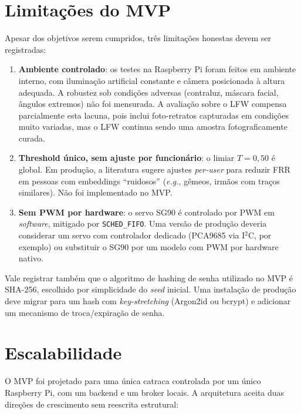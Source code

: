 \documentclass[12pt,a4paper]{report}
\begin{document}
\section{Limitações do MVP}

Apesar dos objetivos serem cumpridos, três limitações honestas devem
ser registradas:

\begin{enumerate}
    \item \textbf{Ambiente controlado}: os testes na Raspberry Pi
        foram feitos em ambiente interno, com iluminação artificial
        constante e câmera posicionada à altura adequada. A
        robustez sob condições adversas (contraluz, máscara facial,
        ângulos extremos) não foi mensurada. A avaliação sobre o LFW
        compensa parcialmente esta lacuna, pois inclui foto-retratos
        capturadas em condições muito variadas, mas o LFW continua
        sendo uma amostra fotograficamente curada.
    \item \textbf{Threshold único, sem ajuste por funcionário}: o
        limiar $T = 0{,}50$ é global. Em produção, a literatura sugere
        ajustes \textit{per-user} para reduzir FRR em pessoas com
        embeddings ``ruidosos'' (\textit{e.g.}, gêmeos, irmãos com
        traços similares). Não foi implementado no MVP.
    \item \textbf{Sem PWM por hardware}: o servo SG90 é controlado por
        PWM em \textit{software}, mitigado por \texttt{SCHED\_FIFO}.
        Uma versão de produção deveria considerar um servo com
        controlador dedicado (PCA9685 via I$^{2}$C, por exemplo) ou
        substituir o SG90 por um modelo com PWM por hardware nativo.
\end{enumerate}

Vale registrar também que o algoritmo de hashing de senha utilizado
no MVP é SHA-256, escolhido por simplicidade do \textit{seed} inicial.
Uma instalação de produção deve migrar para um hash com
\textit{key-stretching} (Argon2id ou bcrypt) e adicionar um
mecanismo de troca/expiração de senha.

\section{Escalabilidade}

O MVP foi projetado para uma única catraca controlada por um único
Raspberry Pi, com um backend e um broker locais. A arquitetura aceita
duas direções de crescimento sem reescrita estrutural:
\end{document}
